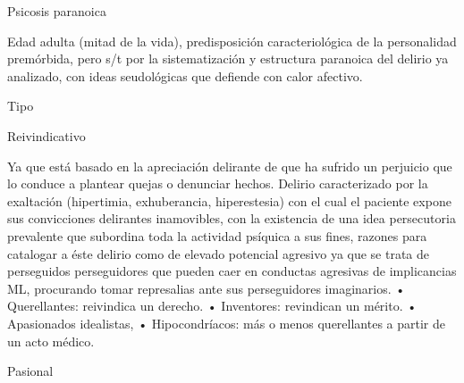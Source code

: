Psicosis paranoica

Edad adulta (mitad de la vida), predisposición caracteriológica de la personalidad premórbida, pero s/t por la sistematización y estructura paranoica del delirio ya analizado, con ideas seudológicas que defiende con calor afectivo.

Tipo

Reivindicativo

Ya que está basado en la apreciación delirante de que ha sufrido un perjuicio que lo conduce a plantear quejas o denunciar hechos. Delirio caracterizado por la exaltación (hipertimia, exhuberancia, hiperestesia) con el cual el paciente expone sus convicciones delirantes inamovibles, con la existencia de una idea persecutoria prevalente que subordina toda la actividad psíquica a sus fines, razones para catalogar a éste delirio como de elevado potencial agresivo ya que se trata de perseguidos perseguidores que pueden caer en conductas agresivas de implicancias ML, procurando tomar represalias ante sus perseguidores imaginarios. • Querellantes: reivindica un derecho. • Inventores: revindican un mérito. • Apasionados idealistas, • Hipocondríacos: más o menos querellantes a partir de un acto médico.

Pasional

